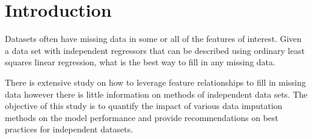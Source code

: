 \documentclass[../paper.tex]{subfiles}
\begin{document}
\section{Introduction}

Datasets often have missing data in some or all of the features of interest.
Given a data set with independent regressors that can be described using ordinary least squares linear regression, what is the best way to fill in any missing data.


There is extensive study on how to leverage feature relationships to fill in missing data however there is little information on methods of independent data sets.
The objective of this study is to quantify the impact of various data imputation methods on the model performance and provide recommendations on best practices for independent datasets.



\end{document}
